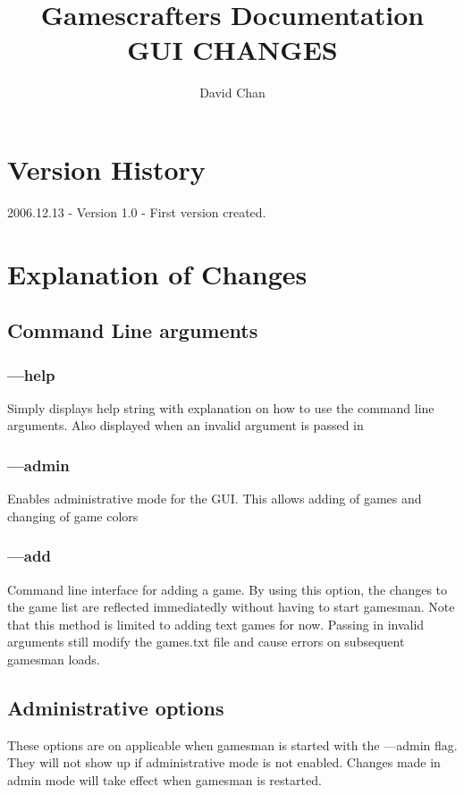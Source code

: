 \documentclass[11pt]{article}
\begin{document}
\title{Gamescrafters Documentation\\
GUI CHANGES}
\author{David Chan}
\date{}
\maketitle

\section*{Version History}
2006.12.13 - Version 1.0 - First version created.

\tableofcontents
\newpage

\section{Explanation of Changes}

\subsection{Command Line arguments}
\subsubsection{---help}
Simply displays help string with explanation on how to use the command line arguments. Also displayed when an invalid argument is passed in

\subsubsection{---admin}
Enables administrative mode for the GUI. This allows adding of games and changing of game colors

\subsubsection{---add}
Command line interface for adding a game. By using this option, the changes to the game list are reflected immediatedly without having to start gamesman. Note that this method is limited to adding text games for now. Passing in invalid arguments still modify the games.txt file and cause errors on subsequent gamesman loads.

\subsection{Administrative options}
These options are on applicable when gamesman is started with the ---admin flag. They will not show up if administrative mode is not enabled. Changes made in admin mode will take effect when gamesman is restarted.
\end{document}
